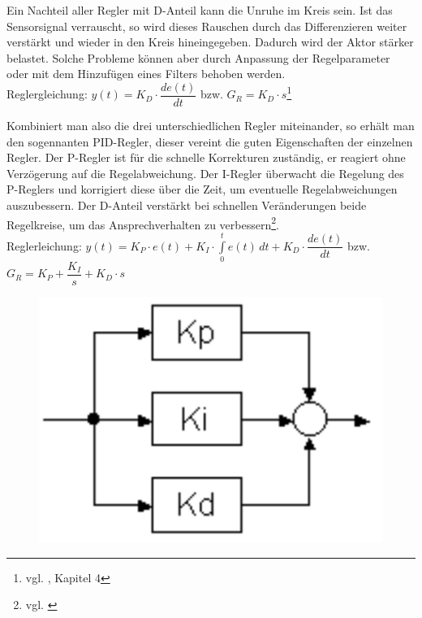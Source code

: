 {{Ein Nachteil aller Regler mit D-Anteil kann die Unruhe im Kreis sein. Ist das Sensorsignal verrauscht, so wird dieses Rauschen durch das Differenzieren weiter verstärkt und wieder in den Kreis hineingegeben. Dadurch wird der Aktor stärker belastet. Solche Probleme können aber durch Anpassung der Regelparameter oder mit dem Hinzufügen eines Filters behoben werden.
\\[4mm]
Reglergleichung: \hspace{7mm} $y(t) = K_D \cdot \dfrac{de(t)}{dt}$\hspace{5mm} bzw. \hspace{5mm} $G_R = K_D \cdot s$\footnote{vgl. \cite{AUT5}, Kapitel 4}

\newpage

Kombiniert man also die drei unterschiedlichen Regler miteinander, so erhält man den sogennanten PID-Regler, dieser vereint die guten Eigenschaften der einzelnen Regler. Der P-Regler ist für die schnelle Korrekturen zuständig, er reagiert ohne Verzögerung auf die Regelabweichung. Der I-Regler überwacht die Regelung des P-Reglers und korrigiert diese über die Zeit, um eventuelle Regelabweichungen auszubessern. Der D-Anteil verstärkt bei schnellen Veränderungen beide Regelkreise, um das Ansprechverhalten zu verbessern\footnote{vgl. \cite{PID-Regler}}.
\\[4mm]
Reglerleichung: \hspace{3mm} $y(t) = K_P \cdot e(t) + K_I \cdot \int\limits_{0}^{t} e(t) \,dt + K_D \cdot \dfrac{de(t)}{dt}$ \hspace{3mm} bzw. \hspace{3mm} $G_R = K_P + \dfrac{K_I}{s} + K_D \cdot s$
\\[5mm]
\begin{figure}[H]
	\begin{center}
		\includegraphics[scale=0.15]{figures/antrieb/PID_Regler.png}

\end{center}
\end{figure}}}
